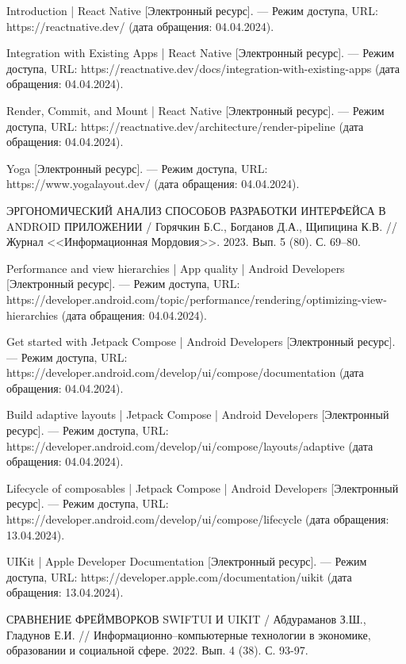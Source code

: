\begin{thebibliography}{}
	Introduction | React Native [Электронный ресурс]. --- Режим доступа, URL: https://reactnative.dev/ (дата обращения: 04.04.2024).
	
	Integration with Existing Apps | React Native [Электронный ресурс]. --- Режим доступа, URL: https://reactnative.dev/docs/integration-with-existing-apps (дата обращения: 04.04.2024).
	
	Render, Commit, and Mount | React Native [Электронный ресурс]. --- Режим доступа, URL: https://reactnative.dev/architecture/render-pipeline (дата обращения: 04.04.2024).
	
	Yoga [Электронный ресурс]. --- Режим доступа, URL: https://www.yogalayout.dev/ (дата обращения: 04.04.2024).
	
	ЭРГОНОМИЧЕСКИЙ АНАЛИЗ СПОСОБОВ РАЗРАБОТКИ ИНТЕРФЕЙСА В ANDROID ПРИЛОЖЕНИИ / Горячкин Б.С., Богданов Д.А., Щипицина К.В. // Журнал <<Информационная Мордовия>>. 2023. Вып. 5 (80). С. 69--80.
	
	Performance and view hierarchies  | App quality | Android Developers [Электронный ресурс]. --- Режим доступа, URL: https://developer.android.com/topic/performance/rendering/optimizing-view-hierarchies (дата обращения: 04.04.2024).
	
	Get started with Jetpack Compose | Android Developers [Электронный ресурс]. --- Режим доступа, URL: https://developer.android.com/develop/ui/compose/documentation (дата обращения: 04.04.2024).
	
	Build adaptive layouts | Jetpack Compose | Android Developers [Электронный ресурс]. --- Режим доступа, URL: https://developer.android.com/develop/ui/compose/layouts/adaptive (дата обращения: 04.04.2024).

	Lifecycle of composables  | Jetpack Compose | Android Developers [Электронный ресурс]. --- Режим доступа, URL: https://developer.android.com/develop/ui/compose/lifecycle (дата обращения: 13.04.2024).
	
	UIKit | Apple Developer Documentation [Электронный ресурс]. --- Режим доступа, URL: https://developer.apple.com/documentation/uikit (дата обращения: 13.04.2024).
	
	СРАВНЕНИЕ ФРЕЙМВОРКОВ SWIFTUI И UIKIT / Абдураманов З.Ш., Гладунов Е.И. // Информационно--компьютерные технологии в экономике, образовании и социальной сфере. 2022. Вып. 4 (38). С. 93-97.
	

\end{thebibliography}
